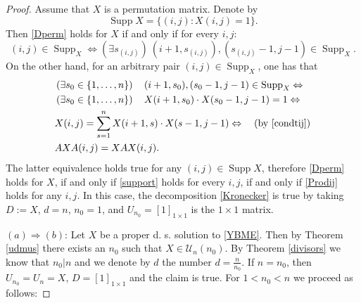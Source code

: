 \documentclass{article}
\theoremstyle{definition}\newtheorem{example}{Example}[section]
\def\U{{\mathcal{U}}}
\begin{document}
	\begin{proof} 
		Assume that $X$ is a permutation matrix. Denote by 
		$$\operatorname{Supp}X=\{(i,j): X(i,j)=1\}.$$
		Then  \eqref{Dperm} holds for $X$ if and only if for every $i,j$: \begin{equation}\label{support}(i,j)\in\operatorname{Supp}_X\Leftrightarrow \left(\exists s_{(i,j)}\right)\ (i+1,s_{(i,j)}),(s_{(i,j)}-1,j-1)\in\operatorname{Supp}_X.\end{equation}
		On the other hand, for an arbitrary pair $(i,j)\in \operatorname{Supp}_X$, one has  that
		\begin{eqnarray}\label{Prodij}
			\begin{aligned}&\left(\exists s_0\in\{1,\ldots,n\}\right)\quad (i+1,s_0),(s_0-1,j-1)\in\operatorname{Supp}_X\Leftrightarrow \\
				&\left(\exists s_0\in\{1,\ldots,n\}\right)\quad X(i+1,s_0)\cdot X(s_0-1,j-1)=1\Leftrightarrow\\
				&X(i,j)=\sum_{s=1}^n X(i+1,s)\cdot X(s-1,j-1)\Leftrightarrow \quad\left(\textrm{by \eqref{condtij}}\right)\\
				&AXA(i,j)=XAX(i,j).
		\end{aligned}\end{eqnarray}
		The latter equivalence holds true for any $(i,j)\in\operatorname{Supp}X$, therefore \eqref{Dperm} holds for $X$, if and only if \eqref{support} holds for every $i,j$, if and only if \eqref{Prodij} holds for any $i,j$.
		In this case, the decomposition \eqref{Kronecker} is true by taking $D:=X$, $d=n$, $n_0=1$, and $U_{n_0}=[1]_{1\times 1}$ is the $1\times 1$ matrix.
		
		$(a)\Rightarrow(b)$: Let $X$ be a proper d. s. solution to \eqref{YBME}. Then by Theorem \ref{udmus} there exists an $n_0$ such that $X\in \U_n(n_0)$. By Theorem \ref{divisors} we know that $n_0|n$ and we denote by $d$ the number $d=\frac{n}{n_0}$.  If $n=n_0$, then $U_{n_0}=U_n=X$, $D=[1]_{1\times 1}$  and the claim is true. For $1<n_0<n$ we proceed as follows:
		

\end{proof}
\end{document}
